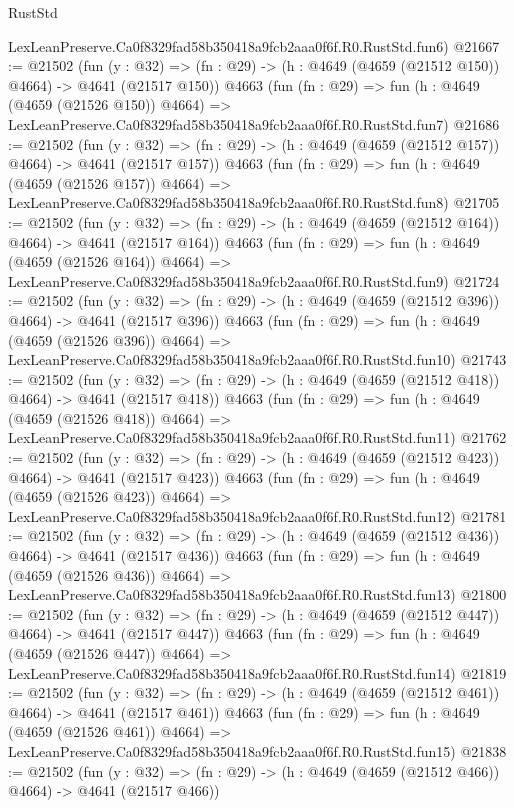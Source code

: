 \begin{lexlean}{RustStd}
\begin{coremodule}
    LexLeanPreserve.Ca0f8329fad58b350418a9fcb2aaa0f6f.R0.RustStd.fun6)
@21667 := @21502
    (fun (y : @32) => (fn : @29) -> (h : @4649 (@4659 (@21512 @150)) @4664) -> @4641 (@21517 @150))
    @4663
    (fun (fn : @29) =>
    fun (h : @4649 (@4659 (@21526 @150)) @4664) =>
    LexLeanPreserve.Ca0f8329fad58b350418a9fcb2aaa0f6f.R0.RustStd.fun7)
@21686 := @21502
    (fun (y : @32) => (fn : @29) -> (h : @4649 (@4659 (@21512 @157)) @4664) -> @4641 (@21517 @157))
    @4663
    (fun (fn : @29) =>
    fun (h : @4649 (@4659 (@21526 @157)) @4664) =>
    LexLeanPreserve.Ca0f8329fad58b350418a9fcb2aaa0f6f.R0.RustStd.fun8)
@21705 := @21502
    (fun (y : @32) => (fn : @29) -> (h : @4649 (@4659 (@21512 @164)) @4664) -> @4641 (@21517 @164))
    @4663
    (fun (fn : @29) =>
    fun (h : @4649 (@4659 (@21526 @164)) @4664) =>
    LexLeanPreserve.Ca0f8329fad58b350418a9fcb2aaa0f6f.R0.RustStd.fun9)
@21724 := @21502
    (fun (y : @32) => (fn : @29) -> (h : @4649 (@4659 (@21512 @396)) @4664) -> @4641 (@21517 @396))
    @4663
    (fun (fn : @29) =>
    fun (h : @4649 (@4659 (@21526 @396)) @4664) =>
    LexLeanPreserve.Ca0f8329fad58b350418a9fcb2aaa0f6f.R0.RustStd.fun10)
@21743 := @21502
    (fun (y : @32) => (fn : @29) -> (h : @4649 (@4659 (@21512 @418)) @4664) -> @4641 (@21517 @418))
    @4663
    (fun (fn : @29) =>
    fun (h : @4649 (@4659 (@21526 @418)) @4664) =>
    LexLeanPreserve.Ca0f8329fad58b350418a9fcb2aaa0f6f.R0.RustStd.fun11)
@21762 := @21502
    (fun (y : @32) => (fn : @29) -> (h : @4649 (@4659 (@21512 @423)) @4664) -> @4641 (@21517 @423))
    @4663
    (fun (fn : @29) =>
    fun (h : @4649 (@4659 (@21526 @423)) @4664) =>
    LexLeanPreserve.Ca0f8329fad58b350418a9fcb2aaa0f6f.R0.RustStd.fun12)
@21781 := @21502
    (fun (y : @32) => (fn : @29) -> (h : @4649 (@4659 (@21512 @436)) @4664) -> @4641 (@21517 @436))
    @4663
    (fun (fn : @29) =>
    fun (h : @4649 (@4659 (@21526 @436)) @4664) =>
    LexLeanPreserve.Ca0f8329fad58b350418a9fcb2aaa0f6f.R0.RustStd.fun13)
@21800 := @21502
    (fun (y : @32) => (fn : @29) -> (h : @4649 (@4659 (@21512 @447)) @4664) -> @4641 (@21517 @447))
    @4663
    (fun (fn : @29) =>
    fun (h : @4649 (@4659 (@21526 @447)) @4664) =>
    LexLeanPreserve.Ca0f8329fad58b350418a9fcb2aaa0f6f.R0.RustStd.fun14)
@21819 := @21502
    (fun (y : @32) => (fn : @29) -> (h : @4649 (@4659 (@21512 @461)) @4664) -> @4641 (@21517 @461))
    @4663
    (fun (fn : @29) =>
    fun (h : @4649 (@4659 (@21526 @461)) @4664) =>
    LexLeanPreserve.Ca0f8329fad58b350418a9fcb2aaa0f6f.R0.RustStd.fun15)
@21838 := @21502
    (fun (y : @32) => (fn : @29) -> (h : @4649 (@4659 (@21512 @466)) @4664) -> @4641 (@21517 @466))

\end{coremodule}
\end{lexlean}
